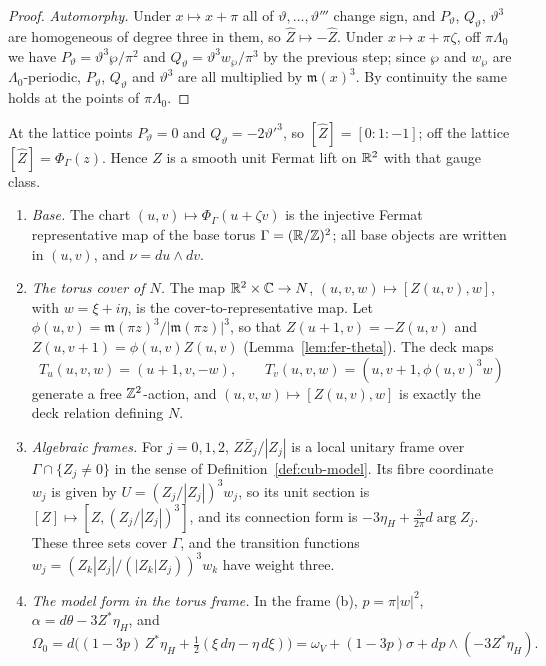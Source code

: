 \begin{proof}
\emph{Automorphy.} Under $x\mapsto x+\pi$ all of $\vartheta,\dots,\vartheta'''$ change sign, and $P_\vartheta$, $Q_\vartheta$,
$\vartheta^3$ are homogeneous of degree three in them, so $\hat Z\mapsto-\hat Z$. Under $x\mapsto x+\pi\zeta$, off
$\pi\Lambda_0$ we have $P_\vartheta=\vartheta^3\wp/\pi^2$ and $Q_\vartheta=\vartheta^3w_\wp/\pi^3$ by the previous step; since $\wp$ and
$w_\wp$ are $\Lambda_0$-periodic, $P_\vartheta$, $Q_\vartheta$ and $\vartheta^3$ are all multiplied by $\mathfrak m(x)^3$. By continuity
the same holds at the points of $\pi\Lambda_0$.
\end{proof}

At the lattice points $P_\vartheta=0$ and $Q_\vartheta=-2\vartheta'^3$, so $[\hat Z]=[0:1:-1]$; off the lattice
$[\hat Z]=\Phi_\Gamma(z)$. Hence $Z$ is a smooth unit Fermat lift on $\mathbb{R}^2$ with that gauge class.

\begin{construction}\label{cons:fer-atlas}
\begin{enumerate}[label=(\alph*)]
\item \emph{Base.} The chart $(u,v)\mapsto\Phi_\Gamma(u+\zeta v)$ is the injective Fermat representative map of the base torus $\Gamma=(\mathbb{R}/\mathbb{Z})^2$; all base objects are written in $(u,v)$, and $\nu=du\wedge dv$.
\item \emph{The torus cover of $N$.} The map $\mathbb{R}^2\times\mathbb{C}\to N$, $(u,v,w)\mapsto[Z(u,v),w]$, with $w=\xi+i\eta$, is the cover-to-representative map. Let $\phi(u,v)=\mathfrak m(\pi z)^3/|\mathfrak m(\pi z)|^3$, so that $Z(u+1,v)=-Z(u,v)$
and $Z(u,v+1)=\phi(u,v)Z(u,v)$ (Lemma~\ref{lem:fer-theta}). The deck maps
\[
 T_u(u,v,w)=(u+1,v,-w),\qquad T_v(u,v,w)=(u,v+1,\phi(u,v)^3w)
\]
generate a free $\mathbb{Z}^2$-action, and $(u,v,w)\mapsto[Z(u,v),w]$ is exactly the deck relation defining $N$.
\item \emph{Algebraic frames.} For $j=0,1,2$, $Z\bar Z_j/|Z_j|$ is a local unitary frame over $\Gamma\cap\{Z_j\ne0\}$ in the sense
of Definition~\ref{def:cub-model}. Its fibre coordinate $w_j$ is given by $U=(Z_j/|Z_j|)^3w_j$, so its unit section is
$[Z]\mapsto[Z,(Z_j/|Z_j|)^3]$, and its connection form is $-3\eta_H+\frac3{2\pi}d\arg Z_j$. These three sets cover $\Gamma$, and the
transition functions $w_j=(Z_k|Z_j|/(|Z_k|Z_j))^3w_k$ have weight three.
\item \emph{The model form in the torus frame.} In the frame (b), $p=\pi|w|^2$, $\alpha=d\theta-3Z^*\eta_H$, and
\[
 \Omega_0=d\Big((1-3p)\,Z^*\eta_H+\tfrac12(\xi\,d\eta-\eta\,d\xi)\Big)=\omega_V+(1-3p)\sigma+dp\wedge(-3Z^*\eta_H).
\]
\end{enumerate}
\end{construction}

